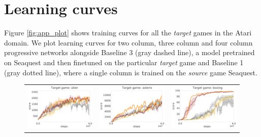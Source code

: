 \section{Learning curves}
\label{sec:appendix_curves}

Figure \ref{fig:app_plot} shows training curves for all the \textit{target} games in the Atari domain.
We plot learning curves for two column, three column and four column progressive networks alongside Baseline 3 (gray dashed line), a model pretrained on Seaquest and then finetuned on the particular \textit{target} game and Baseline 1 (gray dotted line), where a single column is trained on the \textit{source} game Seaquest.

\begin{figure}
     \begin{tabular}{ccc}
        \includegraphics[width=.33\textwidth]{figures/app_plots/mainpaper-nolegend-seaquest_riverraid_pong_to_alien} &
        \includegraphics[width=.33\textwidth]{figures/app_plots/mainpaper-nolegend-seaquest_riverraid_pong_to_asterix} &
        \includegraphics[width=.33\textwidth]{figures/app_plots/mainpaper-nolegend-seaquest_riverraid_pong_to_boxing} \\


\end{tabular}
\end{figure}
